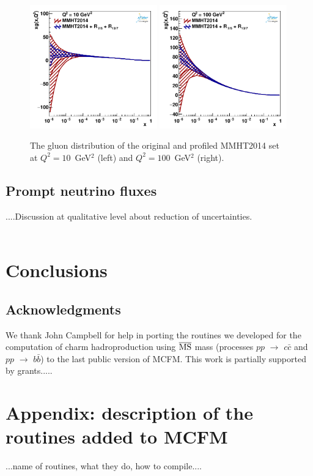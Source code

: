 \documentclass[12pt,a4paper]{article}
\begin{document}
\begin{figure}
    \centering
    \includegraphics[width=0.49\textwidth]{figs/pdf-nnlo/q2_10_pdf_g.pdf}
    \includegraphics[width=0.49\textwidth]{figs/pdf-nnlo/q2_100_pdf_g.pdf}
    \caption{The gluon distribution of the original and profiled MMHT2014 set at $Q^2 = 10$~GeV$^2$ (left) and $Q^2 = 100$~GeV$^2$ (right).}
    \label{fig:extrap-profile}
\end{figure}

\subsection{Prompt neutrino fluxes}

....Discussion at qualitative level about reduction of uncertainties.
\\
\\

\section{Conclusions}
\label{conclu}


\subsection*{Acknowledgments}
We thank John Campbell for help in porting the routines we developed for
the computation of charm hadroproduction using $\overline{\rm MS}$ mass 
(processes $pp$ $\rightarrow$ $c\bar{c}$ and $pp$ $\rightarrow$ $b\bar{b}$) 
to the last public version of MCFM. 
This work is partially supported by grants.....

\section*{Appendix: description of the routines added to MCFM}
...name of routines, what they do, how to compile.... 

\cleardoublepage
\newpage

 

\end{document}
